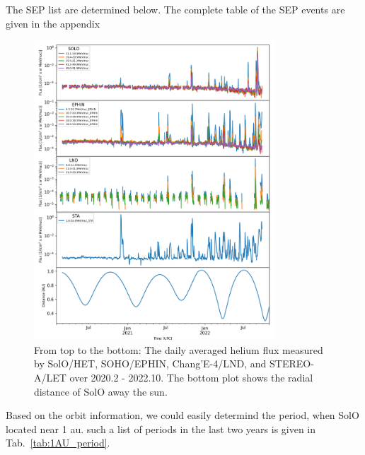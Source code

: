 The SEP list are determined below. The complete table of the SEP events are given in the appendix
\begin{figure}
    \centering
    \includegraphics[width = 0.8\textwidth]{images/ACR/overview_Helium_4_instrument.png}
    \caption[Overview of the helium measuremet by different instruments]{From top to the bottom: The daily averaged helium flux measured by \ac{SolO}/\ac{HET}, \ac{SOHO}/\ac{EPHIN}, Chang'E-4/\ac{LND}, and \ac{STEREO}-A/\ac{LET} over 2020.2 - 2022.10. The bottom plot shows the radial distance of \ac{SolO} away the sun.
    }
    \label{fig:overview_helium_intensity}
\end{figure}


Based on the orbit information, we could easily determind the period, when \ac{SolO} located near 1 au. such a list of periods in the last two years is given in Tab.~\ref{tab:1AU_period}.

